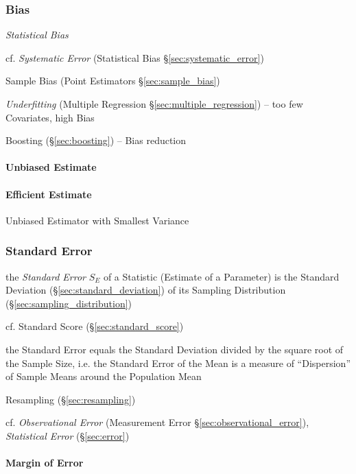 \subsubsection{Bias}\label{sec:bias}

\emph{Statistical Bias}

cf. \emph{Systematic Error} (Statistical Bias \S\ref{sec:systematic_error})

Sample Bias (Point Estimators \S\ref{sec:sample_bias})

\emph{Underfitting} (Multiple Regression \S\ref{sec:multiple_regression}) -- too
few Covariates, high Bias

Boosting (\S\ref{sec:boosting}) -- Bias reduction



\paragraph{Unbiased Estimate}\label{sec:unbiased_estimate}\hfill

\paragraph{Efficient Estimate}\label{sec:efficient_estimate}\hfill

Unbiased Estimator with Smallest Variance



\subsubsection{Standard Error}\label{sec:standard_error}

the \emph{Standard Error} $S_E$ of a Statistic (Estimate of a Parameter) is the
Standard Deviation (\S\ref{sec:standard_deviation}) of its Sampling Distribution
(\S\ref{sec:sampling_distribution})

cf. Standard Score (\S\ref{sec:standard_score})

the Standard Error equals the Standard Deviation divided by the square root of
the Sample Size, i.e. the Standard Error of the Mean is a measure of
``Dispersion'' of Sample Means around the Population Mean

\fist Resampling (\S\ref{sec:resampling})

\fist cf. \emph{Observational Error} (Measurement Error
\S\ref{sec:observational_error}), \emph{Statistical Error} (\S\ref{sec:error})



\paragraph{Margin of Error}\label{sec:margin_of_error}\hfill

